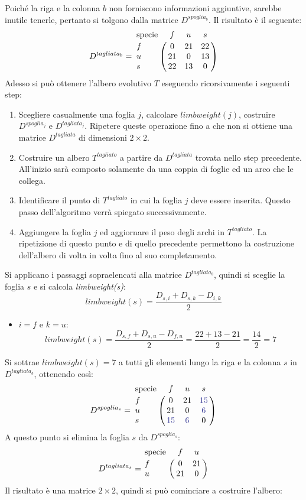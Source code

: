 Poiché la riga e la colonna $b$ non forniscono informazioni aggiuntive, sarebbe inutile tenerle, pertanto si tolgono dalla matrice $D^{spoglia_{b}}$. Il risultato è il seguente:
\[
D^{tagliata_{b}}= \bordermatrix{\text{specie}&f&u&s\cr
                f& 0 & 21 & 22\cr
                u& 21 & 0 & 13\cr
                s& 22 & 13 & 0}
\]
Adesso si può ottenere l'albero evolutivo $T$ eseguendo ricorsivamente i seguenti step:
\begin{enumerate}
	\item Scegliere casualmente una foglia $j$, calcolare $limbweight(j)$, costruire $D^{spoglia_{j}}$ e  $D^{tagliata_{j}}$. Ripetere queste operazione fino a che non si ottiene una matrice $D^{tagliata}$ di dimensioni $2 \times 2$.
	\item Costruire un albero $T^{tagliato}$ a partire da $D^{tagliata}$ trovata nello step precedente. All'inizio sarà composto solamente da una coppia di foglie ed un arco che le collega.
	\item Identificare il punto di $T^{tagliato}$ in cui la foglia $j$ deve essere inserita. Questo passo dell'algoritmo verrà spiegato successivamente.
	\item Aggiungere la foglia $j$ ed aggiornare il peso degli archi in $T^{tagliato}$. La ripetizione di questo punto e di quello precedente permettono la costruzione dell'albero di volta in volta fino al suo completamento.
\end{enumerate}
Si applicano i passaggi sopraelencati alla matrice $D^{tagliata_{b}}$, quindi si sceglie la foglia $s$ e si calcola \textit{limbweight(s)}:
\[limbweight(s)=\frac{D_{s,i}+D_{s,k}-D_{i,k}}{2}\]
\begin{itemize}
	\item $i=f$ e $k=u$:
	\[limbweight(s)=\frac{D_{s,f}+D_{s,u}-D_{f,u}}{2}=\frac{22+13-21}{2}=\frac{14}{2}=7\]
\end{itemize}
Si sottrae $limbweight(s)=7$ a tutti gli elementi lungo la riga e la colonna $s$ in $D^{tagliata_{b}}$, ottenendo così:
\[
D^{spoglia_{s}}= \bordermatrix{\text{specie}&f&u&s\cr
                f& 0 & 21 & {\color{Blue} 15}\cr
                u& 21 & 0 & {\color{Blue} 6}\cr
                s& {\color{Blue} 15} & {\color{Blue} 6} & 0}
\]
A questo punto si elimina la foglia $s$ da $D^{spoglia_{s}}$:
\[
D^{tagliata_{s}}= \bordermatrix{\text{specie}&f&u\cr
                f& 0 & 21\cr
                u& 21 & 0}
\]
Il risultato è una matrice $2 \times 2$, quindi si può cominciare a costruire l'albero:
